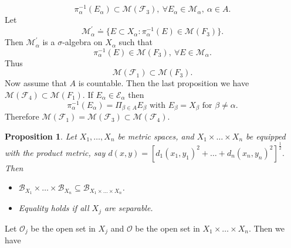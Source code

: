 \documentclass[12pt]{report}
\newtheorem{prop}[theorem]{Proposition}
\begin{document}
\[
\pi^{-1}_\alpha (E_\alpha) \subset \mathcal{M} (\mathcal{F}_3), \
\forall E_\alpha
\in \mathcal{M}_\alpha, \ \alpha \in A.
\]  Let
\[
\mathcal{M}^\prime_\alpha \doteq \{ E \subset X_\alpha:
\pi^{-1}_\alpha (E) \in
\mathcal{M} (F_3)\}.
\]
 Then $\mathcal{M}^\prime_\alpha$ is a $\sigma$-algebra on
$X_\alpha$ such that
\[
\pi^{-1}_\alpha (E) \in \mathcal{M}(F_3), \ \forall E \in
\mathcal{M}_\alpha.
\]  Thus
\[
\mathcal{M}(\mathcal{F}_1) \subset \mathcal{M} (F_3).
\]
 Now assume that $A$ is countable.  Then the last proposition we have
$\mathcal{M}(\mathcal{F}_4) \subset \mathcal{M} (F_1)$.   If
$E_\alpha
\in
\mathcal{E}_\alpha$ then
\[
\pi^{-1}_\alpha (E_\alpha) = {\Pi}_{\beta \in A} E_\beta
\mbox{ with } E_\beta = X_\beta \mbox{ for } \beta \ne \alpha.
\]  Therefore $\mathcal{M} (\mathcal{F}_1) =  \mathcal{M}
(\mathcal{F}_3) \subset
\mathcal{M}(\mathcal{F}_4).$



\begin{prop}  Let $X_1, \dots, X_n$ be metric spaces, and $X_1 \times
\dots \times  X_n$ be equipped with the product metric, say
$ d(x, y) = [d_1(x_1, y_1)^2 + \dots + d_n(x_n, y_n)^2]^{\frac{1}{2}}.
$ Then
\begin{itemize}
\item[1.]  $\mathcal{B}_{X_1} \times \dots \times
\mathcal{B}_{X_n}
\subseteq	 \mathcal{B}_{X_1\times \dots\times X_n}$.
\item[2.]   Equality holds if all $X_j$ are separable.
\end{itemize}
\end{prop}

\vspace{.25cm}
  Let $\mathcal{O}_j$ be the open set in $X_j$ and
$\mathcal{O}$  be the open set in $X_1
\times
\dots \times X_n$.  Then we have
\end{document}
